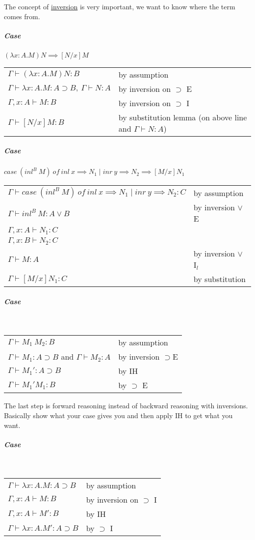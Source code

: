\documentclass[12 pt]{article}
\begin{document}
    The concept of \underline{inversion} is very important, we want to
    know where the term comes from.
    \subparagraph{Case} $(\lambda x : A.M) N \implies [N/x] M$
    \\\begin{tabular}{l l}
    $\Gamma \vdash (\lambda x : A . M) N : B$ & by assumption
    \\ $\Gamma \vdash \lambda x: A.M : A \supset B,\ \Gamma \vdash N :
    A$ & by inversion on $\supset$ E
    \\ $\Gamma, x : A \vdash M : B$ & by inversion on $\supset$ I
    \\ $\Gamma \vdash [N/x]M:B$ & by substitution lemma (on above line
    and $\Gamma \vdash N:A$)
    \end{tabular}
    \subparagraph{Case} $case\ (inl^B \ M) \ of \ inl\ x \implies N_1
    \mid inr\ y \implies N_2 \implies [M/x] N_1$
    \\\begin{tabular}{l l}
    $\Gamma \vdash case\ (inl^B \ M) \ of \ inl\ x \implies N_1
        \mid inr\ y \implies N_2 : C $ & by assumption
        \\ $\Gamma \vdash inl^B \ M : A \lor B$ & by inversion $\lor$ E
        \\ $\Gamma, x:A \vdash N_1 : C$
        \\ $\Gamma, x:B \vdash N_2 : C$
        \\ $\Gamma \vdash M:A$ & by inversion $\lor$ I$_l$
        \\ $\Gamma \vdash [M/x]N_1 : C$ & by substitution
      \end{tabular}
      \subparagraph{Case} 
      \DP
      \\
      \begin{tabular}{l l}
        $\Gamma \vdash M_1 \ M_2 : B$& by assumption
        \\ $\Gamma \vdash M_1 : A \supset B$ and $\Gamma \vdash M_2 : A$ & by inversion $\supset$E
        \\ $\Gamma \vdash M_1' : A \supset B$ & by IH
        \\ $\Gamma \vdash M_1' M_1 : B$ & by $\supset$ E
      \end{tabular}
      The last step is forward reasoning instead of backward reasoning
      with inversions. Basically show what your case gives you and
      then apply IH to get what you want.
      \subparagraph{Case}
      \DP
      \\\begin{tabular}{l l}
        $\Gamma \vdash \lambda x : A . M : A \supset B$& by assumption
          \\ $\Gamma, x : A \vdash M:B$ & by inversion on $\supset$ I
          \\ $\Gamma, x:A \vdash M' : B$ & by IH
          \\ $\Gamma \vdash \lambda x : A . M' : A \supset B$ & by $\supset$ I
        \end{tabular}
\end{document}
